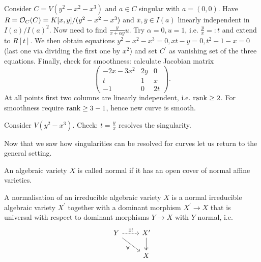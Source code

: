 \documentclass[a4paper,11pt]{article}
\begin{document}
				\begin{eg}
					Consider $C=V(y^2-x^2-x^3)$ and $a\in C$ singular with $a=(0,0)$. Have $R=\mathcal{O}_C(C)=K[x,y]/(y^2-x^2-x^3)$ and $\bar{x},\bar{y}\in I(a)$ linearly independent in $I(a)/I(a)^2$. Now need to find $\frac{y}{x+\alpha y}u$. Try $\alpha=0, u=1$, i.e. $\frac{y}{x}=:t$ and extend to $R[t]$. We then obtain equations $y^2-x^2-x^3=0, xt-y=0,t^2-1-x=0$ (last one via dividing the first one by $x^2$) and set $C^\prime$ as vanishing set of the three equations. Finally, check for smoothness: calculate Jacobian matrix
					\begin{equation*}
						\left(\begin{matrix}
							-2x-3x^2 & 2y & 0\\ t & 1 & x\\ -1 & 0 & 2t
						\end{matrix}\right).
					\end{equation*}
					At all points first two columns are linearly independent, i.e. $\rank \ge2$. For smoothness require $\rank\ge3-1$, hence new curve is smooth.
				\end{eg}

				\begin{eg}
					Consider $V(y^2-x^3)$. Check: $t=\frac{y}{x}$ resolves the singularity.
				\end{eg}

				Now that we saw how singularities can be resolved for curves let us return to the general setting.

				\begin{defi}
					An algebraic variety $X$ is called normal if it has an open cover of normal affine varieties.
				\end{defi}

				\begin{defi}
					A normalisation of an irreducible algebraic variety $X$ is a normal irreducible algebraic variety $X^\prime$ together with a dominant morphism $X^\prime\rightarrow X$ that is universal with respect to dominant morphisms $Y\rightarrow X$ with $Y$ normal, i.e. 
					\begin{equation*}
						\begin{tikzcd}
							Y\ar[r,dashed,"\exists !"]\ar[dr,"\forall"'] & X^{\prime}\ar[d,two heads]\\
							& X
						\end{tikzcd}
					\end{equation*}
				\end{defi}
\end{document}
